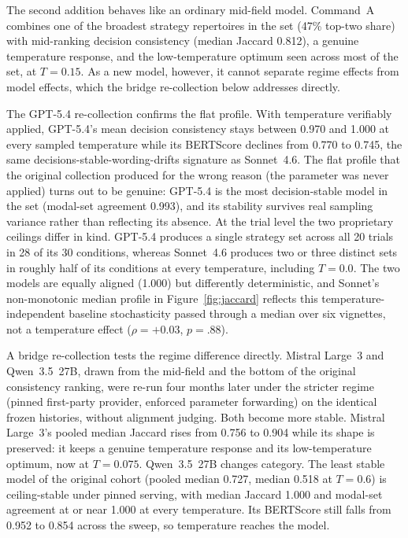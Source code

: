 The second addition behaves like an ordinary mid-field model. Command~A combines one of the broadest strategy repertoires in the set (47\% top-two share) with mid-ranking decision consistency (median Jaccard 0.812), a genuine temperature response, and the low-temperature optimum seen across most of the set, at $T{=}0.15$. As a new model, however, it cannot separate regime effects from model effects, which the bridge re-collection below addresses directly.

The GPT-5.4 re-collection confirms the flat profile. With temperature verifiably applied, GPT-5.4's mean decision consistency stays between 0.970 and 1.000 at every sampled temperature while its BERTScore declines from 0.770 to 0.745, the same decisions-stable-wording-drifts signature as Sonnet~4.6. The flat profile that the original collection produced for the wrong reason (the parameter was never applied) turns out to be genuine: GPT-5.4 is the most decision-stable model in the set (modal-set agreement 0.993), and its stability survives real sampling variance rather than reflecting its absence. At the trial level the two proprietary ceilings differ in kind. GPT-5.4 produces a single strategy set across all 20 trials in 28 of its 30 conditions, whereas Sonnet~4.6 produces two or three distinct sets in roughly half of its conditions at every temperature, including $T{=}0.0$. The two models are equally aligned (1.000) but differently deterministic, and Sonnet's non-monotonic median profile in Figure~\ref{fig:jaccard} reflects this temperature-independent baseline stochasticity passed through a median over six vignettes, not a temperature effect ($\rho=+0.03$, $p=.88$).

A bridge re-collection tests the regime difference directly. Mistral Large~3 and Qwen~3.5~27B, drawn from the mid-field and the bottom of the original consistency ranking, were re-run four months later under the stricter regime (pinned first-party provider, enforced parameter forwarding) on the identical frozen histories, without alignment judging. Both become more stable. Mistral Large~3's pooled median Jaccard rises from 0.756 to 0.904 while its shape is preserved: it keeps a genuine temperature response and its low-temperature optimum, now at $T{=}0.075$. Qwen~3.5~27B changes category. The least stable model of the original cohort (pooled median 0.727, median 0.518 at $T{=}0.6$) is ceiling-stable under pinned serving, with median Jaccard 1.000 and modal-set agreement at or near 1.000 at every temperature. Its BERTScore still falls from 0.952 to 0.854 across the sweep, so temperature reaches the model.

